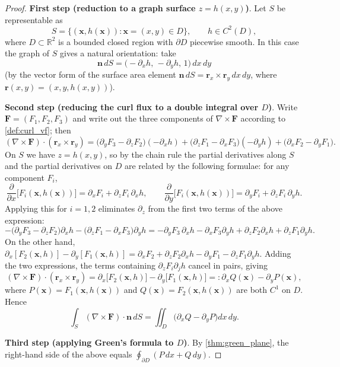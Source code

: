 \begin{proof}
\textbf{First step (reduction to a graph surface $z=h(x,y)$)}. Let $S$ be representable as
\[
S = \{(\mathbf x, h(\mathbf x)) : \mathbf x=(x,y)\in D\},\qquad h\in C^2(D),
\]
where $D\subset\mathbb R^2$ is a bounded closed region with $\partial D$ piecewise smooth. In this case the graph of $S$ gives a natural orientation: take
\[
\mathbf n\,dS = \bigl(-\partial_xh,\,-\partial_yh,\,1\bigr)\,dx\,dy
\]
(by the vector form of the surface area element $\mathbf n\,dS=\mathbf r_x\times\mathbf r_y\,dx\,dy$, where $\mathbf r(x,y)=(x,y,h(x,y))$).

\textbf{Second step (reducing the curl flux to a double integral over $D$)}. Write $\mathbf F=(F_1,F_2,F_3)$ and write out the three components of $\nabla\times\mathbf F$ according to \cref{def:curl_vf}; then
\[
(\nabla\times\mathbf F)\cdot(\mathbf r_x\times\mathbf r_y)
= \bigl(\partial_yF_3-\partial_zF_2\bigr)(-\partial_xh)
+ \bigl(\partial_zF_1-\partial_xF_3\bigr)(-\partial_yh)
+ \bigl(\partial_xF_2-\partial_yF_1\bigr).
\]
On $S$ we have $z=h(x,y)$, so by the chain rule the partial derivatives along $S$ and the partial derivatives on $D$ are related by the following formulae: for any component $F_i$,
\[
\frac{\partial}{\partial x}\bigl[F_i(\mathbf x,h(\mathbf x))\bigr]
= \partial_xF_i+\partial_zF_i\,\partial_xh,
\qquad
\frac{\partial}{\partial y}\bigl[F_i(\mathbf x,h(\mathbf x))\bigr]
= \partial_yF_i+\partial_zF_i\,\partial_yh .
\]
Applying this for $i=1,2$ eliminates $\partial_z$ from the first two terms of the above expression:
\[
-\bigl(\partial_yF_3-\partial_zF_2\bigr)\partial_xh-\bigl(\partial_zF_1-\partial_xF_3\bigr)\partial_yh
= -\partial_yF_3\,\partial_xh-\partial_xF_3\partial_yh+\partial_zF_2\partial_xh+\partial_zF_1\partial_yh .
\]
On the other hand, $
\partial_x[F_2(\mathbf x,h)]-\partial_y[F_1(\mathbf x,h)]
= \partial_xF_2+\partial_zF_2\partial_xh-\partial_yF_1-\partial_zF_1\partial_yh $.
Adding the two expressions, the terms containing $\partial_zF_i\partial_jh$ cancel in pairs, giving
\[
(\nabla\times\mathbf F)\cdot(\mathbf r_x\times\mathbf r_y)
= \partial_x\bigl[F_2(\mathbf x,h)\bigr]-\partial_y\bigl[F_1(\mathbf x,h)\bigr]
=: \partial_x Q(\mathbf x)-\partial_y P(\mathbf x),
\]
where $P(\mathbf x)=F_1(\mathbf x,h(\mathbf x))$ and $Q(\mathbf x)=F_2(\mathbf x,h(\mathbf x))$ are both $C^1$ on $D$. Hence
\[
\int_S(\nabla\times\mathbf F)\cdot\mathbf n\,dS = \iint_D\bigl(\partial_xQ-\partial_yP\bigr)dx\,dy .
\]

\textbf{Third step (applying Green's formula to $D$)}. By \cref{thm:green_plane}, the right-hand side of the above equals $\oint_{\partial D}(P\,dx+Q\,dy)$.


\end{proof}
